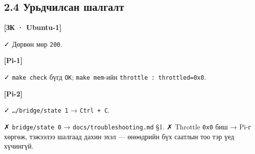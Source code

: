 \hypertarget{ux443ux440ux44cux434ux447ux438ux43bux441ux430ux43d-ux448ux430ux43bux433ux430ux43bux442}{%
\subsection{2.4 Урьдчилсан шалгалт}\label{ux443ux440ux44cux434ux447ux438ux43bux441ux430ux43d-ux448ux430ux43bux433ux430ux43bux442}}

\textbf{{[}ЗК · Ubuntu-1{]}}

\begin{Shaded}
\begin{Highlighting}[]
\KeywordTok{\&\&} \KeywordTok{\&\&} 
\end{Highlighting}
\end{Shaded}

✓ Дөрвөн мөр \texttt{200}.

\textbf{{[}Pi-1{]}}

\begin{Shaded}
\begin{Highlighting}[]
\KeywordTok{\&\&} \KeywordTok{\&\&} \KeywordTok{\&\&} 
\end{Highlighting}
\end{Shaded}

✓ \texttt{make\ check} бүгд \texttt{OK}; \texttt{make\ mem}-ийн \texttt{throttle\ :\allowbreak{}\ throttled=\allowbreak{}0x0}.

\textbf{{[}Pi-2{]}}

\begin{Shaded}
\begin{Highlighting}[]
\KeywordTok{\&\&} 
\end{Highlighting}
\end{Shaded}

✓ \texttt{\ldots{}/\allowbreak{}bridge/\allowbreak{}state\ 1} → \texttt{Ctrl\ +\ C}.

✗ \texttt{bridge/state\ 0} → \texttt{docs/\allowbreak{}troubleshooting.\allowbreak{}md} §1. ✗ Throttle \texttt{0x0} биш → Pi-г хөргөж, тэжээлээ шалгаад дахин эхэл --- өнөөдрийн бүх саатлын тоо тэр үед хүчингүй.

